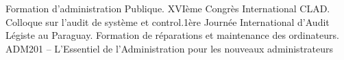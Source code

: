 
\begin{scholarship}
			{Formation d’administration Publique. XVIème Congrès International CLAD.}
			{Colloque sur l’audit de système et control.1ère Journée International d’Audit Légiste au Paraguay.}
			{Formation de réparations et maintenance des ordinateurs.}
			{ADM201 – L’Essentiel de l’Administration pour les nouveaux administrateurs}
\end{scholarship}